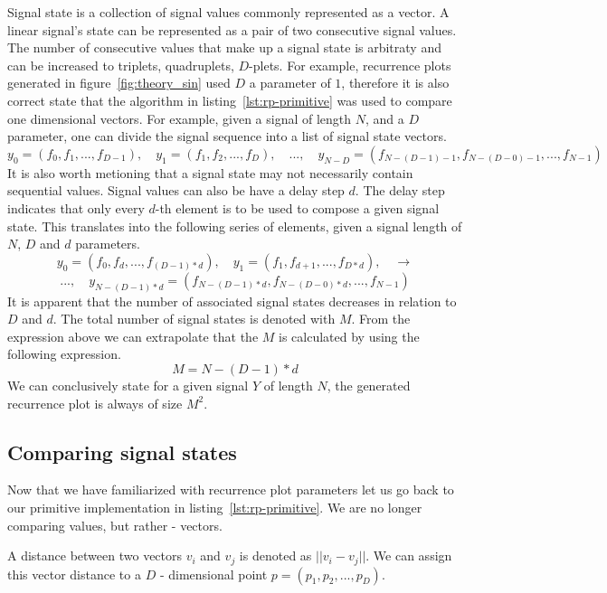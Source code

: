 \documentclass[a4paper,12pt,fleqn]{article}
\begin{document}
Signal state is a collection of signal values commonly represented as a vector.
A linear signal's state can be represented as a pair of two consecutive signal values.
The number of consecutive values that make up a signal state is arbitraty and can be increased to triplets, quadruplets, $D$-plets.
For example, recurrence plots generated in figure~\ref{fig:theory_sin} used $D$ a parameter of $1$, therefore it is also correct state that the algorithm in listing~\ref{lst:rp-primitive} was used to compare one dimensional vectors.
For example, given a signal of length ${N}$, and a $D$ parameter, one can divide the signal sequence into a list of signal state vectors.
\[
  y_0=(f_0,f_1,...,f_{D-1}) ,\quad y_1=(f_1,f_2,...,f_{D}) ,\quad ...,\quad y_{N-D}=
  (f_{N-(D-1)-1},f_{N-(D-0)-1},...,f_{N-1})
\]
It is also worth metioning that a signal state may not necessarily contain sequential values.
Signal values can also be have a delay step $d$.
The delay step indicates that only every $d$-th element is to be used to compose a given signal state.
This translates into the following series of elements, given a signal length of $N$, $D$ and $d$ parameters.
\[
  y_0=(f_0,f_{d},...,f_{(D-1)*d}) ,\quad y_1=(f_1,f_{d+1},...,f_{D*d}) , \quad \longrightarrow
\]
\[
  ...,\quad y_{N-(D-1)*d}=(f_{N-(D-1)*d},f_{N-(D-0)*d},...,f_{N-1})  
\]
It is apparent that the number of associated signal states decreases in relation to $D$ and $d$. 
The total number of signal states is denoted with $M$.
From the expression above we can extrapolate that the $M$ is calculated by using the following expression.
\[
  M = N-(D-1)*d
\]
We can conclusively state for a given signal $Y$ of length $N$, the generated recurrence plot is always of size $M^2$.

\subsection{Comparing signal states}
\label{sec:comparing-signal-states}
Now that we have familiarized with recurrence plot parameters let us go back to our primitive implementation in listing~\ref{lst:rp-primitive}.
We are no longer comparing values, but rather - vectors.

A distance between two vectors $v_i$ and $v_j$ is denoted as $||v_i - v_j||$.
We can assign this vector distance to a $D$ - dimensional point $p = (p_1, p_2, ..., p_D)$.
\end{document}
